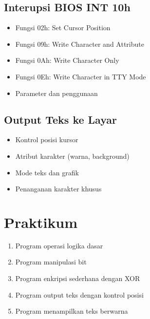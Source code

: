 \subsection{Interupsi BIOS INT 10h}
\begin{itemize}
\item Fungsi 02h: Set Cursor Position
\item Fungsi 09h: Write Character and Attribute
\item Fungsi 0Ah: Write Character Only
\item Fungsi 0Eh: Write Character in TTY Mode
\item Parameter dan penggunaan
\end{itemize}

\subsection{Output Teks ke Layar}
\begin{itemize}
\item Kontrol posisi kursor
\item Atribut karakter (warna, background)
\item Mode teks dan grafik
\item Penanganan karakter khusus
\end{itemize}

\section{Praktikum}
\begin{enumerate}
\item Program operasi logika dasar
\item Program manipulasi bit
\item Program enkripsi sederhana dengan XOR
\item Program output teks dengan kontrol posisi
\item Program menampilkan teks berwarna
\end{enumerate}

